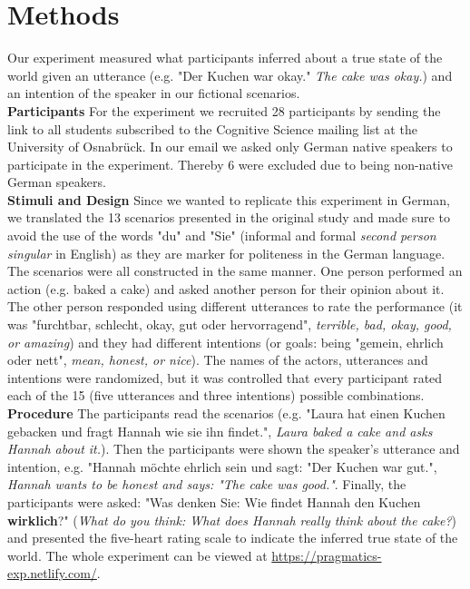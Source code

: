 \documentclass[a4paper,11pt]{article}
\begin{document}
\section{Methods}
Our experiment measured what participants inferred about a true state of the world given an utterance (e.g. "Der Kuchen war okay." \textit{The cake was okay.}) and an intention of the speaker in our fictional scenarios. \\
\textbf{Participants} For the experiment we recruited 28 participants by sending the link to all students subscribed to the Cognitive Science mailing list at the University of Osnabrück. In our email we asked only German native speakers to participate in the experiment. Thereby 6 were excluded due to being non-native German speakers.\\
\textbf{Stimuli and Design} Since we wanted to replicate this experiment in German, we translated the 13 scenarios presented in the original study and made sure to avoid the use of the words "du" and "Sie" (informal and formal \textit{second person singular} in English) as they are marker for politeness in the German language. The scenarios were all constructed in the same manner. One person performed an action (e.g. baked a cake) and asked another person for their opinion about it. The other person responded using different utterances to rate the performance (it was "furchtbar, schlecht, okay, gut oder hervorragend", \textit{terrible, bad, okay, good, or amazing}) and they had different intentions (or goals: being "gemein, ehrlich oder nett", \textit{mean, honest, or nice}). The names of the actors, utterances and intentions were randomized, but it was controlled that every participant rated each of the 15 (five utterances and three intentions) possible combinations.\\
\textbf{Procedure} The participants read the scenarios (e.g. "Laura hat einen Kuchen gebacken und fragt Hannah wie sie ihn findet.", \textit{Laura baked a cake and asks Hannah about it.}). Then the participants were shown the speaker's utterance and intention, e.g. "Hannah möchte ehrlich sein und sagt: "Der Kuchen war gut.", \textit{Hannah wants to be honest and says: "The cake was good."}. Finally, the participants were asked: "Was denken Sie: Wie findet Hannah den Kuchen \textbf{wirklich}?" (\textit{What do you think: What does Hannah really think about the cake?}) and presented the five-heart rating scale to indicate the inferred true state of the world. The whole experiment can be viewed at \url{https://pragmatics-exp.netlify.com/}. 
\end{document}
